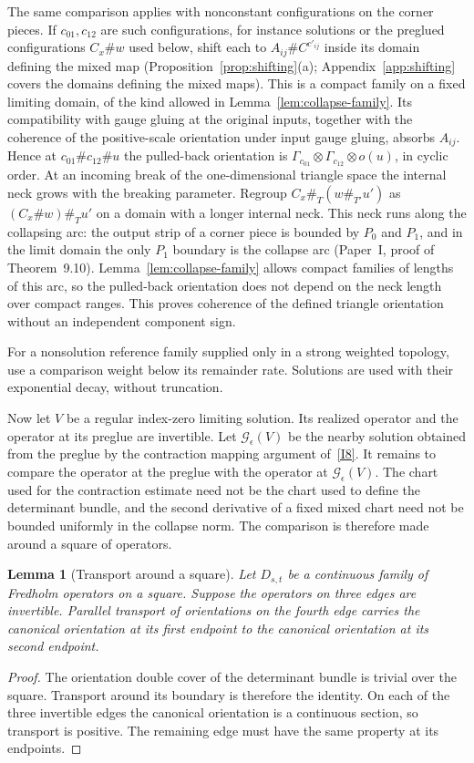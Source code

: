 \documentclass[11pt]{amsart}
\newtheorem{lemma}[theorem]{Lemma}
\theoremstyle{definition}
\theoremstyle{remark}
\theoremstyle{plain}
\numberwithin{equation}{section}
\begin{document}
The same comparison applies with nonconstant configurations on the
corner pieces. If $c_{01},c_{12}$ are such configurations, for instance
solutions or the preglued configurations $C_x\#w$ used below, shift each to
$A_{ij}\#C^{c'_{ij}}$ inside its domain defining the mixed map
(Proposition~\ref{prop:shifting}(a); Appendix~\ref{app:shifting} covers
the domains defining the mixed maps). This is a compact family on a fixed limiting
domain, of the kind allowed in Lemma~\ref{lem:collapse-family}. Its
compatibility with gauge gluing at the original inputs, together with
the coherence of the positive-scale orientation under input gauge
gluing, absorbs $A_{ij}$. Hence at $c_{01}\#c_{12}\#u$ the pulled-back
orientation is $\Gamma_{c_{01}}\otimes\Gamma_{c_{12}}\otimes o(u)$, in
cyclic order. At an incoming break of the one-dimensional triangle space
the internal neck grows with the breaking parameter. Regroup
$C_x\#_T(w\#_{T'}u')$ as $(C_x\#w)\#_Tu'$ on a domain with a longer
internal neck. This neck runs along the collapsing arc: the output
strip of a corner piece is bounded by $P_0$ and $P_1$, and in the
limit domain the only $P_1$ boundary is the collapse arc (Paper~I, proof
of Theorem~9.10). Lemma~\ref{lem:collapse-family} allows compact families
of lengths of this arc, so the pulled-back orientation does not depend on
the neck length over compact ranges. This proves coherence of the
defined triangle orientation without an independent component sign.

For a nonsolution reference family supplied only in a strong
weighted topology, use a comparison weight below its remainder rate.
Solutions are used with their exponential decay, without truncation.

Now let $V$ be a regular index-zero limiting solution. Its realized
operator and the operator at its preglue are invertible. Let
$\mathcal G_\epsilon(V)$ be the nearby solution obtained from the preglue
by the contraction mapping argument of~\ref{I8}. It remains to compare
the operator at the preglue with the operator at $\mathcal G_\epsilon(V)$.
The chart used for the contraction estimate need not be the chart used
to define the determinant bundle, and the second derivative of a fixed
mixed chart need not be bounded uniformly in the collapse norm. The
comparison is therefore made around a square of operators.

\begin{lemma}[Transport around a square]\label{lem:square}
Let $D_{s,t}$ be a continuous family of Fredholm operators
on a square. Suppose the operators on three edges are
invertible. Parallel transport of orientations on the
fourth edge carries the canonical orientation at its
first endpoint to the canonical orientation at its
second endpoint.
\end{lemma}
\begin{proof}
The orientation double cover of the determinant bundle
is trivial over the square. Transport around its
boundary is therefore the identity. On each of the
three invertible edges the canonical orientation is a
continuous section, so transport is positive. The
remaining edge must have the same property at its
endpoints.
\end{proof}
\end{document}
